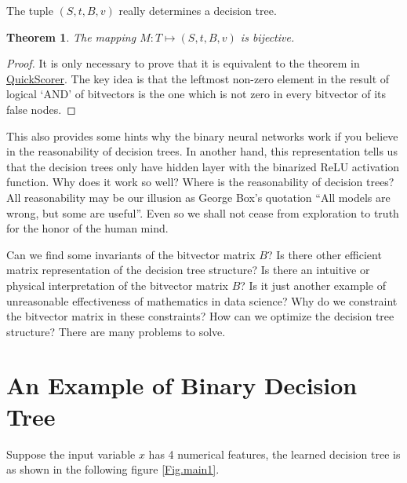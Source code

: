 \documentclass[UTF8]{article}
\newtheorem{theorem}{Theorem}
\newtheorem{proof}{Proof}[section]
\begin{document}
The tuple $(S, t, B, v)$ really determines a decision tree.

\begin{theorem}
The mapping $M: T \mapsto (S, t, B, v)$ is bijective.
\end{theorem}
\begin{proof}
It is only necessary to prove that it is equivalent to the theorem in
\href{http://pages.di.unipi.it/rossano/wp-content/uploads/sites/7/2015/11/sigir15.pdf}{QuickScorer}.
The key idea is that the leftmost non-zero element in the result of logical `AND' of bitvectors
is the one which is not zero in every bitvector of its false nodes.
\end{proof}



This also provides some hints why the binary neural networks work
if you believe in the reasonability of decision trees.
In another hand, this representation tells us that
the decision trees only have hidden layer with the binarized ReLU activation function.
Why does it work so well?
Where is the reasonability of decision trees?
All reasonability may be our illusion as George Box's quotation
``All models are wrong, but some are useful''.
Even so we shall not cease from exploration to truth for the honor of the human mind.



Can we find some invariants of the bitvector matrix $B$?
Is there other efficient matrix representation of the decision tree structure?
Is there an intuitive or physical interpretation of the bitvector matrix $B$?
Is it just another example of unreasonable effectiveness of mathematics in data science?
Why do we constraint the bitvector matrix in these constraints?
How can we optimize the decision tree structure?
There are many problems to solve.


\section{An Example of Binary Decision Tree}

Suppose the input variable $x$ has 4 numerical features,
the learned decision tree is as shown in the following figure \ref{Fig.main1}.
\end{document}
